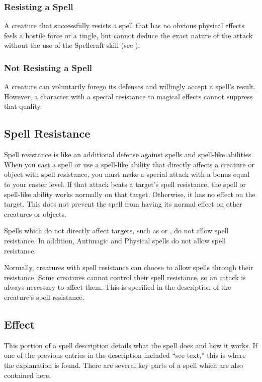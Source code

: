\subsubsection{Resisting a Spell} A creature that successfully resists a spell that has no obvious physical effects feels a hostile force or a tingle, but cannot deduce the exact nature of the attack without the use of the Spellcraft skill (see ).

\subsubsection{Not Resisting a Spell} A creature can voluntarily forego its defenses and willingly accept a spell's result. However, a character with a special resistance to magical effects cannot suppress that quality.

\subsection{Spell Resistance}
Spell resistance is like an additional defense against spells and spell-like abilities. When you cast a spell or use a spell-like ability that directly affects a creature or object with spell resistance, you must make a special attack with a bonus equal to your caster level. If that attack beats a target's spell resistance, the spell or spell-like ability works normally on that target. Otherwise, it has no effect on the target. This does not prevent the spell from having its normal effect on other creatures or objects.

Spells which do not directly affect targets, such as  or , do not allow spell resistance. In addition, Antimagic and Physical spells do not allow spell resistance.

Normally, creatures with spell resistance can choose to allow spells through their resistance. Some creatures cannot control their spell resistance, so an attack is always necessary to affect them. This is specified in the description of the creature's spell resistance.

\subsection{Effect}
This portion of a spell description details what the spell does and how it works. If one of the previous entries in the description included ``see text,'' this is where the explanation is found. There are several key parts of a spell which are also contained here.

